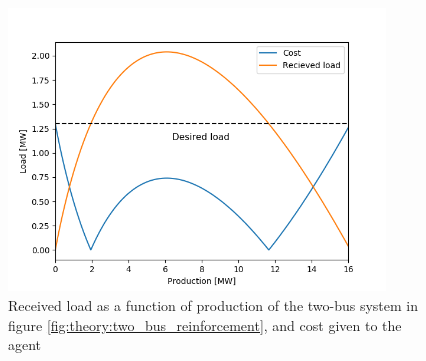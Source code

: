 \documentclass[class=book, crop=false]{standalone}
\begin{document}
\begin{figure}[ht!]
    \center
    \includegraphics[height=7.5cm, width=10cm]{figures/twobus_load_balance.png}
    \caption[size = 9]{Received load as a function of production of the two-bus system in figure \ref{fig:theory:two_bus_reinforcement}, and cost given to the agent}
    \label{fig:theory:two_bus_failing}
\end{figure}
\end{document}
